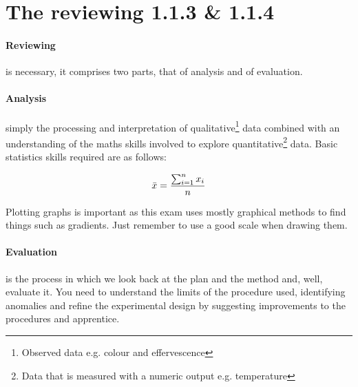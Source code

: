 \section{The reviewing 1.1.3 \& 1.1.4}
	
	\paragraph{Reviewing} is necessary, it comprises two parts, that of analysis and of evaluation.
	
	\paragraph{Analysis} simply the processing and interpretation of qualitative\footnote{Observed data e.g. colour and effervescence} data combined with an understanding of the maths skills involved to explore quantitative\footnote{Data that is measured with a numeric output e.g. temperature} data.
	Basic statistics skills required are as follows:
	
	\begin{center}
		\begin{equation}
		\bar{x} = \frac{\sum_{i=1}^n x_i}{n}
		\end{equation}
	\end{center}
	
	Plotting graphs is important as this exam uses mostly graphical methods to find things such as gradients.
	Just remember to use a good scale when drawing them.
	
	\paragraph{Evaluation} is the process in which we look back at the plan and the method and, well, evaluate it.
	You need to understand the limits of the procedure used, identifying anomalies and refine the experimental design by suggesting improvements to the procedures and apprentice.